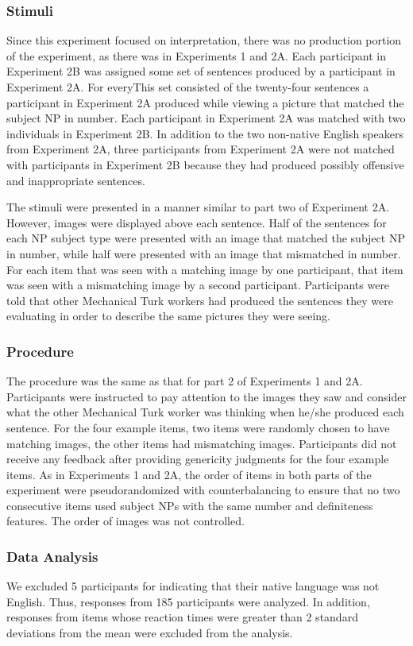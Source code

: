 \documentclass[10pt,letterpaper]{article}
\begin{document}
\subsubsection{Stimuli} \quad Since this experiment focused on interpretation, there was no production portion of the experiment, as there was in Experiments 1 and 2A. Each participant in Experiment 2B was assigned some set of sentences produced by a participant in Experiment 2A. For everyThis set consisted of the twenty-four sentences a participant in Experiment 2A produced while viewing a picture that matched the subject NP in number. Each participant in Experiment 2A was matched with two individuals in Experiment 2B. In addition to the two non-native English speakers from Experiment 2A, three participants from Experiment 2A were not matched with participants in Experiment 2B because they had produced possibly offensive and inappropriate sentences.

The stimuli were presented in a manner similar to part two of Experiment 2A. However, images were displayed above each sentence. Half of the sentences for each NP subject type were presented with an image that matched the subject NP in number, while half were presented with an image that mismatched in number. For each item that was seen with a matching image by one participant, that item was seen with a mismatching image by a second participant. Participants were told that other Mechanical Turk workers had produced the sentences they were evaluating in order to describe the same pictures they were seeing.

\subsubsection{Procedure} \quad The procedure was the same as that for part 2 of Experiments 1 and 2A. Participants were instructed to pay attention to the images they saw and consider what the other Mechanical Turk worker was thinking when he/she produced each sentence. For the four example items, two items were randomly chosen to have matching images, the other items had mismatching images. Participants did not receive any feedback after providing genericity judgments for the four example items. As in Experiments 1 and 2A, the order of items in both parts of the experiment were pseudorandomized with counterbalancing to ensure that no two consecutive items used subject NPs with the same number and definiteness features. The order of images was not controlled.

\subsubsection{Data Analysis} \quad We excluded 5 participants for indicating that their native language was not English. Thus, responses from 185 participants were analyzed. In addition, responses from items whose reaction times were greater than 2 standard deviations from the mean were excluded from the analysis.
\end{document}
